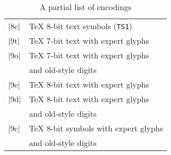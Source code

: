 \documentclass[a4paper]{ltxguide}
\begin{document}
\begin{table}
\begin{minipage}{0.5\textwidth}
\begin{tabular}{ll}
   |8c| & \TeX{} 8-bit text symbols     (\texttt{TS1})  \\
   |9t| & \TeX{} 7-bit text with expert glyphs  \\
   |9o| & \TeX{} 7-bit text with expert glyphs  \\
        & and old-style digits  \\
   |9e| & \TeX{} 8-bit text with expert glyphs  \\
   |9d| & \TeX{} 8-bit text with expert glyphs  \\
        & and old-style digits  \\
   |9c| & \TeX{} 8-bit symbols with expert glyphs \\
        & and old-style digits  \\
   \end{tabular}
   \caption{A partial list of encodings}
\end{minipage}
\end{table}
\end{document}
